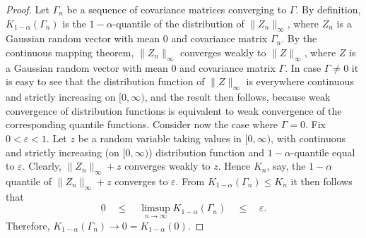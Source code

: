 \documentclass[preprint]{imsart}
\numberwithin{equation}{section}
\begin{document}
\begin{proof}
Let $\Gamma_n$ be a sequence of covariance matrices converging to $\Gamma$. By definition, $K_{1-\alpha}(\Gamma_n)$ is the $1-\alpha$-quantile of the distribution of $\|Z_n\|_{\infty}$, where $Z_n$ is a Gaussian random vector with mean $0$ and covariance matrix $\Gamma_n$. By the continuous mapping theorem, $\|Z_n\|_{\infty}$ converges weakly to $\|Z\|_{\infty}$, where $Z$ is a Gaussian random vector with mean $0$ and covariance matrix $\Gamma$. In case $\Gamma \neq 0$ it is easy to see that the distribution function of $\|Z\|_{\infty}$ is everywhere continuous and strictly increasing on $[0,\infty)$, and the result then follows, because weak convergence of distribution functions is equivalent to weak convergence of the corresponding quantile functions. Consider now the case where $\Gamma = 0$. Fix $0 < \varepsilon < 1$. Let $z$ be a random variable taking values in $[0, \infty)$, with continuous and strictly increasing (on $[0,\infty)$) distribution function and $1-\alpha$-quantile equal to $\varepsilon$. Clearly, $\|Z_n\|_{\infty} + z$ converges weakly to $z$. Hence $K_n$, say, the $1-\alpha$ quantile of $\|Z_n\|_{\infty} + z$ converges to $\varepsilon$. From $K_{1-\alpha}(\Gamma_n) \leq K_n$ it then follows that
%
\begin{equation*}
0 \quad \leq \quad \limsup_{n \rightarrow \infty} K_{1-\alpha}(\Gamma_n) \quad \leq \quad \varepsilon.
\end{equation*}
%
Therefore, $K_{1-\alpha}(\Gamma_n) \to 0 = K_{1-\alpha}(0)$.
\end{proof}
\end{document}
